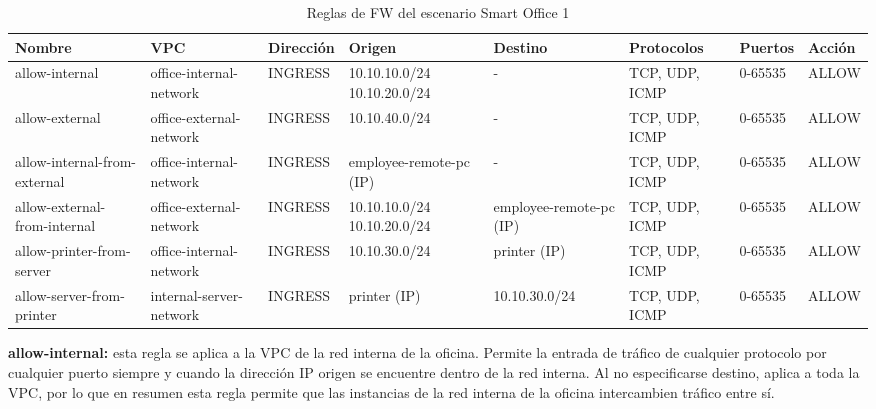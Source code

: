   \begin{table}[h]
    \begin{center}
      \footnotesize\hspace*{-1.75cm}\begin{tabular}{ | m{2cm} | m{2cm} | w{c}{1,5cm} | m{2cm} | m{2cm} | m{2cm} | w{c}{1,25cm} | w{c}{1,25cm} | }
        \hline{} \centering\textbf{Nombre} & \centering\textbf{VPC} & \textbf{Dirección} & \centering\textbf{Origen} & \centering\textbf{Destino} & \centering\textbf{Protocolos} & \textbf{Puertos} & \textbf{Acción} \\ \hline
        allow-internal & office-internal-network & INGRESS & 10.10.10.0/24 10.10.20.0/24 & \centering- & TCP, UDP, ICMP & 0-65535 & ALLOW  \\ \hline{}
        allow-external & office-external-network & INGRESS & 10.10.40.0/24 & \centering- & TCP, UDP, ICMP & 0-65535 & ALLOW  \\ \hline
        allow-internal-from-external & office-internal-network & INGRESS & employee-remote-pc (IP) & \centering- & TCP, UDP, ICMP & 0-65535 & ALLOW  \\ \hline{}
        allow-external-from-internal & office-external-network & INGRESS & 10.10.10.0/24 10.10.20.0/24 & employee-remote-pc (IP) & TCP, UDP, ICMP & 0-65535 & ALLOW  \\ \hline
        allow-printer-from-server & office-internal-network & INGRESS & 10.10.30.0/24 & printer (IP) & TCP, UDP, ICMP & 0-65535 & ALLOW  \\ \hline{}
        allow-server-from-printer & internal-server-network & INGRESS & printer (IP) & 10.10.30.0/24 & TCP, UDP, ICMP & 0-65535 & ALLOW  \\ \hline 
      \end{tabular}\hspace*{-1.75cm}
      \caption{Reglas de FW del escenario Smart Office 1}
      \label{tab:fw1}
    \end{center}
  \end{table}

  \textbf{allow-internal:} esta regla se aplica a la VPC de la red interna de la oficina. Permite la entrada de tráfico de cualquier protocolo por cualquier puerto siempre y cuando la dirección IP origen se encuentre dentro de la red interna. Al no especificarse destino, aplica a toda la VPC, por lo que en resumen esta regla permite que las instancias de la red interna de la oficina intercambien tráfico entre sí.

